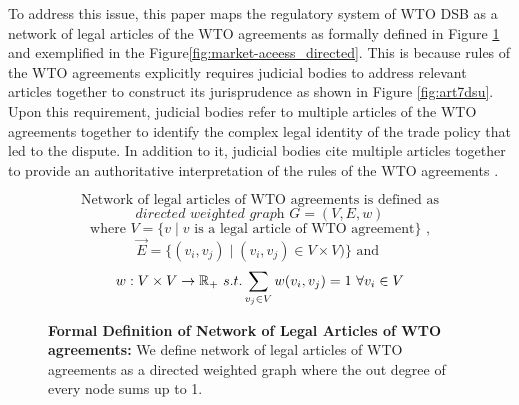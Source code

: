 To address this issue,
this paper maps
the regulatory system of WTO DSB
as a network of legal articles
of the WTO agreements as formally defined in Figure \ref{fig:def} and exemplified in the Figure\ref{fig:market-aceess_directed}. This is because rules of the WTO agreements
explicitly requires judicial bodies to address
relevant articles together to construct its jurisprudence as shown in Figure \ref{fig:art7dsu}.
Upon this requirement, judicial bodies refer to
multiple articles of the WTO agreements together
to identify the complex legal identity of the trade policy that led to the dispute.
In addition to it, judicial bodies cite multiple articles together
to provide an authoritative interpretation of the rules of the WTO agreements
\citep{oesch2003standards}.

\begin{figure}[ht]
    \[\text{Network of legal articles of WTO agreements is defined as}\] %
    \[ \textit{directed weighted graph }G = (V, E, w) \]
    \[\text{ where } V = \{v \mid v\text{ is a legal article of WTO agreement}\}  \text{ , } \]
    \[\vec{E} = \{(v_i, v_j) \mid (v_i, v_j)\in V \times V)\} \text{ and } \]
    \[w : V \times V \to \Bbb R_{+} \text{ } s.t. \sum_{v_j\in V}{w(v_i, v_j)} = 1 \text{ } \forall v_i \in V\]
    \caption{\textbf{Formal Definition of Network of Legal Articles of WTO agreements: }
        We define network of legal articles of WTO agreements
        as a directed weighted graph where the out degree of every node sums up to 1.}
    \label{fig:def}
\end{figure}

